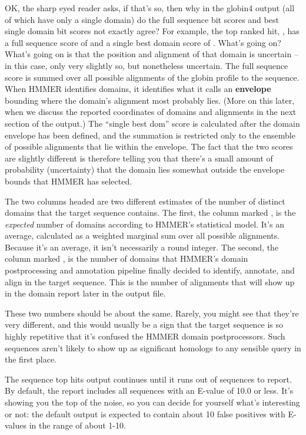 OK, the sharp eyed reader asks, if that's so, then why in the globin4
output (all of which have only a single domain) do the full sequence
bit scores and best single domain bit scores not exactly agree? For
example, the top ranked hit, \mono{\SGUseqname{}}, 
has a full sequence score of \SGUbitscore{} and a single
best domain score of \SGUdombitscore{}. What's going on? What's going on is that
the position and alignment of that domain is uncertain -- in this
case, only very slightly so, but nonetheless uncertain. The full
sequence score is summed over all possible alignments of the globin
profile to the \mono{\SGUseqname{}} sequence. When HMMER identifies
domains, it identifies what it calls an \textbf{envelope} bounding
where the domain's alignment most probably lies. (More on this later,
when we discuss the reported coordinates of domains and alignments in
the next section of the output.) The ``single best dom'' score is
calculated after the domain envelope has been defined, and the
summation is restricted only to the ensemble of possible alignments
that lie within the envelope. The fact that the two scores are
slightly different is therefore telling you that there's a small
amount of probability (uncertainty) that the domain lies somewhat
outside the envelope bounds that HMMER has selected.

The two columns headed  are two different estimates of
the number of distinct domains that the target sequence contains. The
first, the column marked , is the \emph{expected} number of
domains according to HMMER's statistical model. It's an average,
calculated as a weighted marginal sum over all possible
alignments. Because it's an average, it isn't necessarily a round
integer. The second, the column marked , is the number of
domains that HMMER's domain postprocessing and annotation pipeline
finally decided to identify, annotate, and align in the target
sequence. This is the number of alignments that will show up in the
domain report later in the output file.

These two numbers should be about the same. Rarely, you might see that
they're very different, and this would usually be a sign that the
target sequence is so highly repetitive that it's confused the HMMER
domain postprocessors. Such sequences aren't likely to show up as
significant homologs to any sensible query in the first place.

The sequence top hits output continues until it runs out of sequences
to report. By default, the report includes all sequences with an
E-value of 10.0 or less. It's showing you the top of the noise, so you
can decide for yourself what's interesting or not: the default output
is expected to contain about 10 false positives with E-values in the
range of about 1-10.

